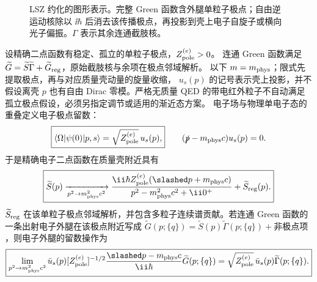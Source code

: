 \begin{figure}[htbp]
 \centering
 
 \caption{LSZ 约化的图形表示。完整 Green 函数含外腿单粒子极点；自由逆运动核除以 $\ii\hbar$ 后消去该传播极点，再投影到壳上电子自旋子或横向光子偏振。$\Gamma$ 表示其余连通截肢核。}
 \label{fig:qed-lsz-amputation-dp8}
\end{figure}

\begin{proposition}
设精确二点函数有稳定、孤立的单粒子极点，$Z_{\rm pole}^{(e)}>0$。
连通 Green 函数满足 $\widetilde G=\widetilde S\widetilde\Gamma+\widetilde G_{\rm reg}$，原始截肢核与余项在极点邻域解析。
以下 $m=m_{\rm phys}$；限式先提取极点，再与对应质量壳动量的旋量收缩，
$u_s(p)$ 的记号表示壳上投影，并不假设离壳 $p$ 也有自由 Dirac 零模。严格无质量 QED 的带电红外粒子不自动满足孤立极点假设，必须另指定调节或适用的渐近态方案。
电子场与物理单电子态的重叠定义电子极点留数：
\begin{equation}
 \boxed{
 \langle\Omega|\psi(0)|p,s\rangle
 =\sqrt{Z_{\rm pole}^{(e)}}\,u_s(p),}
 \qquad
 (\slashed p-m_{\rm phys}c)u_s(p)=0.
 \label{eq:dirac-field-pole-overlap-dp8}
\end{equation}
于是精确电子二点函数在质量壳附近具有
\begin{equation}
 \boxed{
 \widetilde S(p)
 \xrightarrow[p^2\to m_{\rm phys}^2c^2]{}
 \frac{\ii\hbar Z_{\rm pole}^{(e)}(\slashed p+m_{\rm phys}c)}
 {p^2-m_{\rm phys}^2c^2+\ii0^+}
 +\widetilde S_{\rm reg}(p).}
 \label{eq:dirac-exact-pole-lsz-dp8}
\end{equation}
$\widetilde S_{\rm reg}$ 在该单粒子极点邻域解析，并包含多粒子连续谱贡献。若连通 Green 函数的一条出射电子外腿在该极点附近写成 $\widetilde G(p;\{q\})=\widetilde S(p)\widetilde\Gamma(p;\{q\})+\text{非极点项}$，则电子外腿的留数操作为
\begin{equation}
 \boxed{
 \lim_{p^2\to m_{\rm phys}^2c^2}
 \bar u_s(p)[Z_{\rm pole}^{(e)}]^{-1/2}
 \frac{\slashed p-m_{\rm phys}c}{\ii\hbar}
 \widetilde G(p;\{q\})
 =\sqrt{Z_{\rm pole}^{(e)}}\,\bar u_s(p)\widetilde\Gamma(p;\{q\}).}
 \label{eq:dirac-lsz-amputation-r68}
\end{equation}
\end{proposition}
